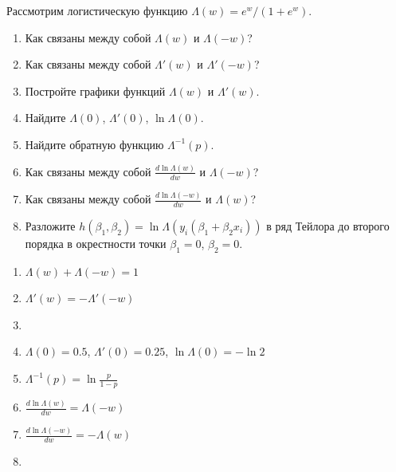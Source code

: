 \begin{problem}
Рассмотрим логистическую функцию $\Lambda(w) = e^w / (1 + e^w)$.
\begin{enumerate}
\item Как связаны между собой $\Lambda(w)$ и  $\Lambda(-w)$?
\item Как связаны между собой $\Lambda'(w)$ и  $\Lambda'(-w)$?
\item Постройте графики функций $\Lambda(w)$ и $\Lambda'(w)$.
\item Найдите $\Lambda(0)$, $\Lambda'(0)$, $\ln\Lambda(0)$.
\item Найдите обратную функцию $\Lambda^{-1}(p)$.
\item Как связаны между собой $\frac{d\ln\Lambda(w)}{dw}$ и $\Lambda(-w)$?
\item Как связаны между собой $\frac{d\ln\Lambda(-w)}{dw}$ и $\Lambda(w)$?
\item Разложите $h(\beta_1, \beta_2)=\ln\Lambda(y_i(\beta_1 + \beta_2 x_i))$ в ряд Тейлора до второго порядка в окрестности точки $\beta_1=0$, $\beta_2=0$.
\end{enumerate}


\begin{sol}
\begin{enumerate}
\item $\Lambda(w) + \Lambda(-w) = 1$
\item $\Lambda'(w) = -\Lambda'(-w)$
\item
\item $\Lambda(0) = 0.5$, $\Lambda'(0) = 0.25$, $\ln\Lambda(0) = -\ln 2$
\item $\Lambda^{-1}(p) = \ln \frac{p}{1-p}$
\item $\frac{d\ln\Lambda(w)}{dw} = \Lambda(-w)$
\item $\frac{d\ln\Lambda(-w)}{dw} = -\Lambda(w)$
\item
\end{enumerate}
\end{sol}
\end{problem}






